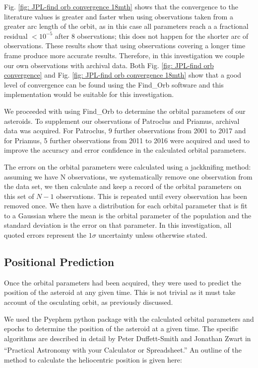 \documentclass[10pt, twocolumn]{revtex4}    %
\begin{document}
Fig. \ref{fig: JPL-find orb convergence 18mth} shows that the convergence to the literature values is greater and faster when using observations taken from a greater arc length of the orbit, as in this case all parameters reach a a fractional residual $<10^{-5}$ after 8 observations; this does not happen for the shorter arc of observations. These results show that using observations covering a longer time frame produce more accurate results. Therefore, in this investigation we couple our own observations with archival data. Both Fig. \ref{fig: JPL-find orb convergence} and Fig. \ref{fig: JPL-find orb convergence 18mth} show that a good level of convergence can be found using the Find\_Orb software and this implementation would be suitable for this investigation.

We proceeded with using Find\_Orb to determine the orbital parameters of our asteroids. To supplement our observations of Patroclus and Priamus, archival data was acquired. For Patroclus, 9 further observations from 2001 to 2017 and for Priamus, 5 further observations from 2011 to 2016 were acquired and used to improve the accuracy and error confidence in the calculated orbital parameters.

The errors on the orbital parameters were calculated using a jackknifing method: assuming we have N observations, we systematically remove one observation from the data set, we then calculate and keep a record of the orbital parameters on this set of $N-1$ observations. This is repeated until every observation has been removed once. We then have  a distribution for each orbital parameter that is fit to a Gaussian where the mean is the orbital parameter of the population and the standard deviation is the error on that parameter. In this investigation, all quoted errors represent the $1\sigma$ uncertainty unless otherwise stated.

\subsection*{Positional Prediction}

Once the orbital parameters had been acquired, they were used to predict the position of the asteroid at any given time. This is not trivial as it must take account of the osculating orbit, as previously discussed.

We used the Pyephem python package with the calculated orbital parameters and epochs to determine the position of the asteroid at a given time. The specific algorithms are described in detail by Peter Duffett-Smith and Jonathan Zwart in ``Practical Astronomy with your Calculator or Spreadsheet.''\textsuperscript{\cite[p.121-130]{Duffett-SmithPracticalastronomyyour2011}} An outline of the method to calculate the heliocentric position is given here:
\end{document}
